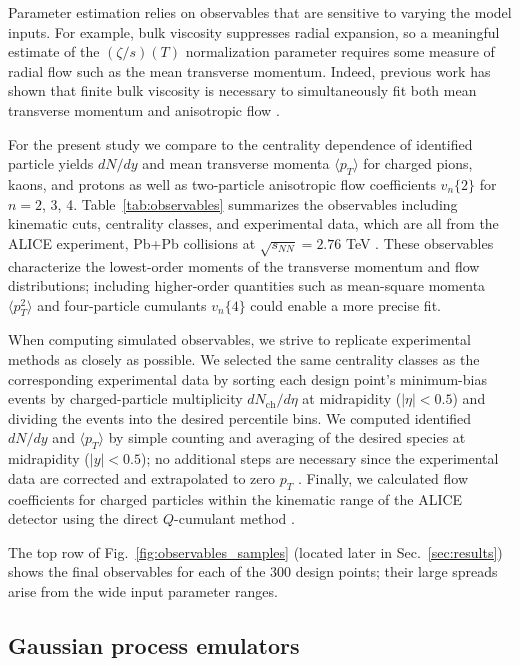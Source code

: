 \documentclass[aps,prc,reprint,amsmath,nofootinbib]{revtex4-1}
\newcommand{\avg}[1]{\langle #1 \rangle}
\newcommand{\nch}{N_\text{ch}}
\newcommand{\sqrts}{\sqrt{s_{NN}}}
\newcommand{\vnk}[2]{v_#1\{#2\}}
\begin{document}
Parameter estimation relies on observables that are sensitive to varying the model inputs.
For example, bulk viscosity suppresses radial expansion, so a meaningful estimate of the $(\zeta/s)(T)$ normalization parameter requires some measure of radial flow such as the mean transverse momentum.
Indeed, previous work has shown that finite bulk viscosity is necessary to simultaneously fit both mean transverse momentum and anisotropic flow \cite{Ryu:2015vwa}.

For the present study we compare to the centrality dependence of identified particle yields $dN/dy$ and mean transverse momenta $\avg{p_T}$ for charged pions, kaons, and protons as well as two-particle anisotropic flow coefficients $\vnk n 2$ for $n = 2$, 3, 4.
Table~\ref{tab:observables} summarizes the observables including kinematic cuts, centrality classes, and experimental data, which are all from the ALICE experiment, Pb+Pb collisions at $\sqrts = 2.76$ TeV \cite{Abelev:2013vea,ALICE:2011ab}.
These observables characterize the lowest-order moments of the transverse momentum and flow distributions;
including higher-order quantities such as mean-square momenta $\avg{p_T^2}$ \cite{Heinz:2015arc} and four-particle cumulants $\vnk n 4$ \cite{Aamodt:2010pa} could enable a more precise fit.

When computing simulated observables, we strive to replicate experimental methods as closely as possible.
We selected the same centrality classes as the corresponding experimental data by sorting each design point's minimum-bias events by charged-particle multiplicity $d\nch/d\eta$ at midrapidity ($|\eta| < 0.5$) and dividing the events into the desired percentile bins.
We computed identified $dN/dy$ and $\avg{p_T}$ by simple counting and averaging of the desired species at midrapidity ($|y| < 0.5$); no additional steps are necessary since the experimental data are corrected and extrapolated to zero $p_T$ \cite{Abelev:2013vea}.
Finally, we calculated flow coefficients for charged particles within the kinematic range of the ALICE detector using the direct $Q$-cumulant method \cite{Bilandzic:2010jr}.

The top row of Fig.~\ref{fig:observables_samples} (located later in Sec.~\ref{sec:results}) shows the final observables for each of the 300 design points;
their large spreads arise from the wide input parameter ranges.

\subsection{Gaussian process emulators}
\end{document}
